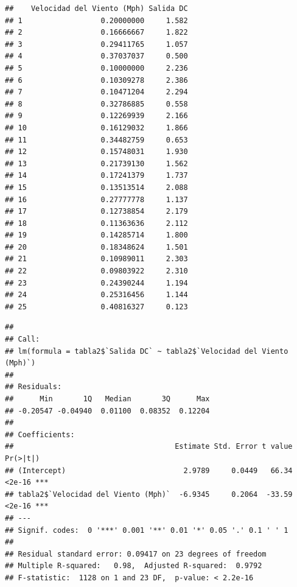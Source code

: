 \documentclass[
]{article}
\newenvironment{Shaded}{\begin{snugshade}}{\end{snugshade}}
\newcommand{\AttributeTok}[1]{\textcolor[rgb]{0.77,0.63,0.00}{#1}}
\newcommand{\FunctionTok}[1]{\textcolor[rgb]{0.00,0.00,0.00}{#1}}
\newcommand{\NormalTok}[1]{#1}
\newcommand{\OtherTok}[1]{\textcolor[rgb]{0.56,0.35,0.01}{#1}}
\newcommand{\SpecialCharTok}[1]{\textcolor[rgb]{0.00,0.00,0.00}{#1}}
\newcommand{\StringTok}[1]{\textcolor[rgb]{0.31,0.60,0.02}{#1}}
\begin{document}
\begin{verbatim}
##    Velocidad del Viento (Mph) Salida DC
## 1                  0.20000000     1.582
## 2                  0.16666667     1.822
## 3                  0.29411765     1.057
## 4                  0.37037037     0.500
## 5                  0.10000000     2.236
## 6                  0.10309278     2.386
## 7                  0.10471204     2.294
## 8                  0.32786885     0.558
## 9                  0.12269939     2.166
## 10                 0.16129032     1.866
## 11                 0.34482759     0.653
## 12                 0.15748031     1.930
## 13                 0.21739130     1.562
## 14                 0.17241379     1.737
## 15                 0.13513514     2.088
## 16                 0.27777778     1.137
## 17                 0.12738854     2.179
## 18                 0.11363636     2.112
## 19                 0.14285714     1.800
## 20                 0.18348624     1.501
## 21                 0.10989011     2.303
## 22                 0.09803922     2.310
## 23                 0.24390244     1.194
## 24                 0.25316456     1.144
## 25                 0.40816327     0.123
\end{verbatim}

\begin{Shaded}
\end{Shaded}

\begin{verbatim}
## 
## Call:
## lm(formula = tabla2$`Salida DC` ~ tabla2$`Velocidad del Viento (Mph)`)
## 
## Residuals:
##      Min       1Q   Median       3Q      Max 
## -0.20547 -0.04940  0.01100  0.08352  0.12204 
## 
## Coefficients:
##                                     Estimate Std. Error t value Pr(>|t|)    
## (Intercept)                           2.9789     0.0449   66.34   <2e-16 ***
## tabla2$`Velocidad del Viento (Mph)`  -6.9345     0.2064  -33.59   <2e-16 ***
## ---
## Signif. codes:  0 '***' 0.001 '**' 0.01 '*' 0.05 '.' 0.1 ' ' 1
## 
## Residual standard error: 0.09417 on 23 degrees of freedom
## Multiple R-squared:   0.98,  Adjusted R-squared:  0.9792 
## F-statistic:  1128 on 1 and 23 DF,  p-value: < 2.2e-16
\end{verbatim}
\end{document}

